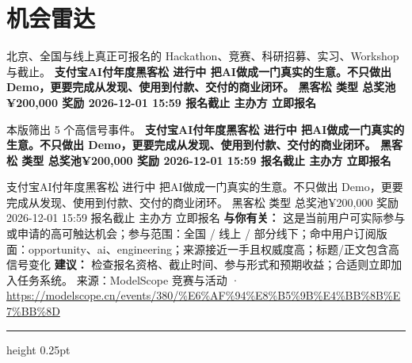 \documentclass[10.5pt]{ctexart}
\begin{document}
\section*{机会雷达}
{\color{ormuted} 北京、全国与线上真正可报名的 Hackathon、竞赛、科研招募、实习、Workshop 与截止。}
\vspace{2mm}
{\LARGE\bfseries 支付宝AI付年度黑客松 进行中 把AI做成一门真实的生意。不只做出 Demo，更要完成从发现、使用到付款、交付的商业闭环。 黑客松 类型 总奖池¥200,000 奖励 2026-12-01 15:59 报名截止 主办方 立即报名}\par
\vspace{1mm}
{\color{ormuted} 本版筛出 5 个高信号事件。}
\vspace{3mm}
{\Large\bfseries 支付宝AI付年度黑客松 进行中 把AI做成一门真实的生意。不只做出 Demo，更要完成从发现、使用到付款、交付的商业闭环。 黑客松 类型 总奖池¥200,000 奖励 2026-12-01 15:59 报名截止 主办方 立即报名}\par
支付宝AI付年度黑客松 进行中 把AI做成一门真实的生意。不只做出 Demo，更要完成从发现、使用到付款、交付的商业闭环。 黑客松 类型 总奖池¥200,000 奖励 2026-12-01 15:59 报名截止 主办方 立即报名
\textbf{与你有关：} 这是当前用户可实际参与或申请的高可触达机会；参与范围：全国 / 线上 / 部分线下；命中用户订阅版面：opportunity、ai、engineering；来源接近一手且权威度高；标题/正文包含高信号变化
\textbf{建议：} 检查报名资格、截止时间、参与形式和预期收益；合适则立即加入任务系统。
{\footnotesize\color{ormuted} 来源：ModelScope 竞赛与活动 · \url{https://modelscope.cn/events/380/%E6%AF%94%E8%B5%9B%E4%BB%8B%E7%BB%8D}}
\vspace{4mm}
\hrule height 0.25pt
\vspace{3mm}
\end{document}
